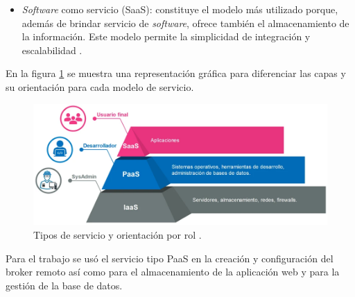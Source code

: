 \begin{itemize}
\item \emph{Software} como servicio (SaaS): constituye el modelo más utilizado porque, además de brindar servicio de \emph{software}, ofrece también el almacenamiento de la información. Este modelo permite la simplicidad de integración y escalabilidad \citep{BOOK:2}. 




\end{itemize}

En la figura \ref{fig:servicios} se muestra una representación gráfica para diferenciar las capas y su orientación para cada modelo de servicio.




\begin{figure}[htbp]
	\centering
	\includegraphics[width=.9\textwidth]{./Figures/servicios.png}
	\caption{Tipos de servicio y orientación por rol \protect\footnotemark.}

	\label{fig:servicios}
\end{figure}



Para el trabajo se usó el servicio tipo PaaS en la creación y configuración del broker remoto así como para el almacenamiento de la aplicación web y para la gestión de la base de datos.



